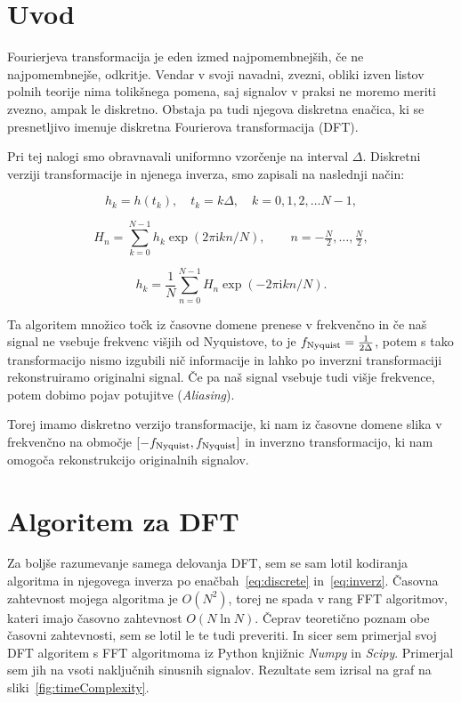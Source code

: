 \documentclass{porocilo}
\newcommand{\ii}{\mathrm{i}}
\begin{document}
\maketitle

\section{Uvod}
Fourierjeva transformacija je eden izmed najpomembnejših, če ne najpomembnejše, odkritje. Vendar v svoji navadni, zvezni, obliki izven listov polnih teorije nima tolikšnega pomena, saj signalov v praksi ne moremo meriti zvezno, ampak le diskretno. Obstaja pa tudi njegova diskretna enačica, ki se presnetljivo imenuje diskretna Fourierova transformacija (DFT).

Pri tej nalogi smo obravnavali uniformno vzorčenje na interval $\Delta$. Diskretni verziji transformacije in njenega inverza, smo zapisali na naslednji način:

\begin{equation*}
    h_k = h(t_k),\quad t_k = k \Delta, \quad k=0,1,2,\dots N-1,
\end{equation*}

\begin{equation}
    H_n = \sum_{k=0}^{N-1}
    h_k \exp(2 \pi \ii k n / N),
    \qquad n=-\tfrac{N}{2},\dots ,\tfrac{N}{2},
    \label{eq:discrete}
\end{equation}

\begin{equation}
    h_k = \frac{1}{N} \sum_{n=0}^{N-1} H_n \exp(-2 \pi \ii k n / N).
    \label{eq:inverz}
\end{equation}

Ta algoritem množico točk iz časovne domene prenese v frekvenčno in če naš signal ne vsebuje frekvenc višjih od Nyquistove, to je $f_{\rm Nyquist} = \frac{1}{2\Delta}$, potem s tako transformacijo nismo izgubili nič informacije in lahko po inverzni transformaciji rekonstruiramo originalni signal. Če pa naš signal vsebuje tudi višje frekvence, potem dobimo pojav potujitve (\textit{Aliasing}).

Torej imamo diskretno verzijo transformacije, ki nam iz časovne domene slika v frekvenčno na območje $[-f_{\rm Nyquist}, f_{\rm Nyquist}]$ in inverzno transformacijo, ki nam omogoča rekonstrukcijo originalnih signalov.

\section{Algoritem za DFT}
Za boljše razumevanje samega delovanja DFT, sem se sam lotil kodiranja algoritma in njegovega inverza po enačbah~\ref{eq:discrete} in~\ref{eq:inverz}. Časovna zahtevnost mojega algoritma je $O(N^2)$, torej ne spada v rang FFT algoritmov, kateri imajo časovno zahtevnost $O(N\ln N)$. Čeprav teoretično poznam obe časovni zahtevnosti, sem se lotil le te tudi preveriti. In sicer sem primerjal svoj DFT algoritem s FFT algoritmoma iz Python knjižnic \textit{Numpy} in \textit{Scipy}. Primerjal sem jih na vsoti naključnih sinusnih signalov. Rezultate sem izrisal na graf na sliki~\ref{fig:timeComplexity}.
\end{document}
